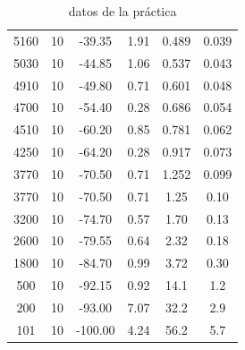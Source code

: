 \documentclass[12pt,a4paper]{article}
\begin{document}
\begin{table}[h!]
\begin{tabular}{|c|c|c|c|c|c|}
5160  & 10 &  -39.35 & 1.91 & 0.489 & 0.039 \\ 
5030  & 10 &  -44.85 & 1.06 & 0.537 & 0.043 \\ 
4910  & 10 &  -49.80 & 0.71 & 0.601 & 0.048 \\ 
4700  & 10 &  -54.40 & 0.28 & 0.686 & 0.054 \\ 
4510  & 10 &  -60.20 & 0.85 & 0.781 & 0.062 \\ 
4250  & 10 &  -64.20 & 0.28 & 0.917 & 0.073 \\ 
3770  & 10 &  -70.50 & 0.71 & 1.252 & 0.099 \\ 
3770  & 10 &  -70.50 & 0.71 & 1.25 & 0.10 \\ 
3200  & 10 &  -74.70 & 0.57 & 1.70 & 0.13 \\ 
2600  & 10 &  -79.55 & 0.64 & 2.32 & 0.18 \\ 
1800  & 10 &  -84.70 & 0.99 & 3.72 & 0.30 \\ 
500  & 10 &  -92.15 & 0.92 & 14.1 & 1.2 \\ 
200  & 10 &  -93.00 & 7.07 & 32.2 & 2.9 \\ 
101  & 10 &  -100.00 & 4.24 & 56.2 & 5.7 \\ 
\hline
\end{tabular} 
\caption{datos de la práctica} 
\label{Tab:datos2} 
\end{table} 
 
 
 
 
\end{document}

